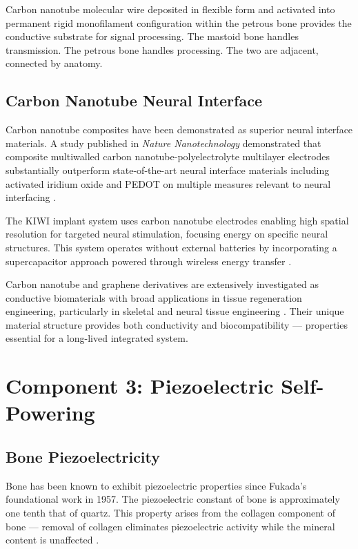 \documentclass[12pt]{article}
\begin{document}
Carbon nanotube molecular wire deposited in flexible form and activated into permanent rigid monofilament configuration within the petrous bone provides the conductive substrate for signal processing. The mastoid bone handles transmission. The petrous bone handles processing. The two are adjacent, connected by anatomy.

\subsection{Carbon Nanotube Neural Interface}

Carbon nanotube composites have been demonstrated as superior neural interface materials. A study published in \textit{Nature Nanotechnology} demonstrated that composite multiwalled carbon nanotube-polyelectrolyte multilayer electrodes substantially outperform state-of-the-art neural interface materials including activated iridium oxide and PEDOT on multiple measures relevant to neural interfacing \cite{cnt_neural_2009}.

The KIWI implant system uses carbon nanotube electrodes enabling high spatial resolution for targeted neural stimulation, focusing energy on specific neural structures. This system operates without external batteries by incorporating a supercapacitor approach powered through wireless energy transfer \cite{cnt_neural_implant}.

Carbon nanotube and graphene derivatives are extensively investigated as conductive biomaterials with broad applications in tissue regeneration engineering, particularly in skeletal and neural tissue engineering \cite{piezo_tissue_2024}. Their unique material structure provides both conductivity and biocompatibility --- properties essential for a long-lived integrated system.

\section{Component 3: Piezoelectric Self-Powering}

\subsection{Bone Piezoelectricity}

Bone has been known to exhibit piezoelectric properties since Fukada's foundational work in 1957. The piezoelectric constant of bone is approximately one tenth that of quartz. This property arises from the collagen component of bone --- removal of collagen eliminates piezoelectric activity while the mineral content is unaffected \cite{piezo_wearable_2025}.
\end{document}
